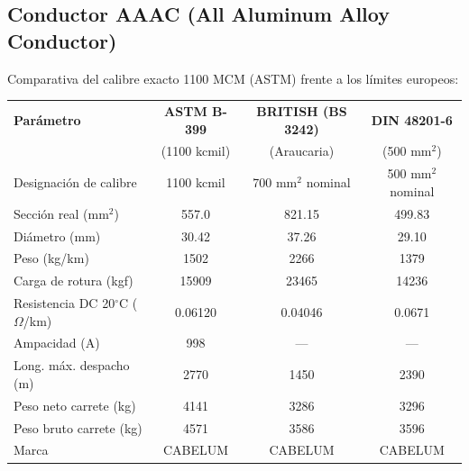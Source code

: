 \documentclass[12pt,a4paper]{article}
\begin{document}
\begin{landscape}
\subsection{Conductor AAAC (All Aluminum Alloy Conductor)}

Comparativa del calibre exacto 1100 MCM (ASTM) frente a los límites europeos:

\begin{center}
\begin{tabular}{p{4cm}c|c|c}
\toprule
\textbf{Parámetro} & \textbf{ASTM B-399} & \textbf{BRITISH (BS 3242)} & \textbf{DIN 48201-6} \\
& (1100 kcmil) & (Araucaria) & (500 mm$^2$) \\
\midrule
Designación de calibre & 1100 kcmil & 700 mm$^2$ nominal & 500 mm$^2$ nominal \\
\midrule
Sección real (mm$^2$) & 557.0 & 821.15 & 499.83 \\
\midrule
Diámetro (mm) & 30.42 & 37.26 & 29.10 \\
\midrule
Peso (kg/km) & 1502 & 2266 & 1379 \\
\midrule
Carga de rotura (kgf) & 15909 & 23465 & 14236 \\
\midrule
Resistencia DC 20$^\circ$C ($\Omega$/km) & 0.06120 & 0.04046 & 0.0671 \\
\midrule
Ampacidad (A) & 998 & --- & --- \\
\midrule
Long. máx. despacho (m) & 2770 & 1450 & 2390 \\
\midrule
Peso neto carrete (kg) & 4141 & 3286 & 3296 \\
\midrule
Peso bruto carrete (kg) & 4571 & 3586 & 3596 \\
\midrule
Marca & CABELUM & CABELUM & CABELUM \\
\bottomrule
\end{tabular}
\end{center}
\end{landscape}
\end{document}
